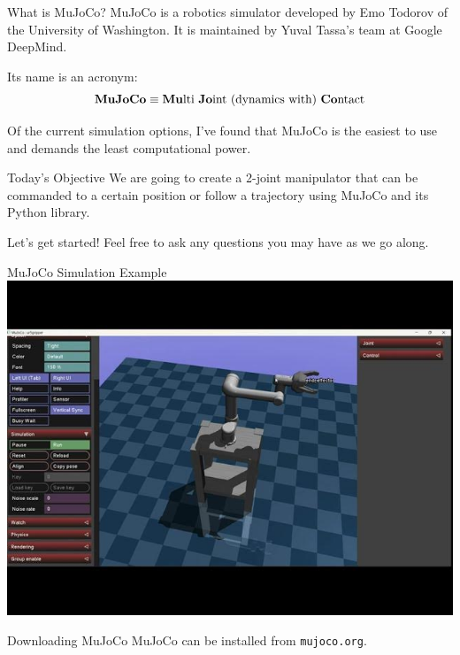 \documentclass[14pt]{beamer}
\begin{document}
	\begin{frame}{What is MuJoCo?}
		MuJoCo is a robotics simulator developed by Emo Todorov of the University of Washington. It is maintained by Yuval Tassa's team at Google DeepMind.
		
		Its name is an acronym: $$\textbf{MuJoCo} \equiv \text{\textbf{Mu}lti \textbf{Jo}int (dynamics with) \textbf{Co}ntact}$$
		
		Of the current simulation options, I've found that MuJoCo is the easiest to use and demands the least computational power.
	\end{frame}
	
	\begin{frame}{Today's Objective}
		We are going to create a 2-joint manipulator that can be commanded to a certain position or follow a trajectory using MuJoCo and its Python library.
		\vspace{0.5cm}
		
		Let's get started! Feel free to ask any questions you may have as we go along.
	\end{frame}
	
	\begin{frame}{MuJoCo Simulation Example}
		\includegraphics[width=\linewidth,trim={0 2cm 0 2cm},clip]{sizhe_tao_thumbnail.jpg}
		
	\end{frame}
	
	\begin{frame}{Downloading MuJoCo}
		MuJoCo can be installed from \texttt{mujoco.org}.
	\end{frame}
	
\end{document}
